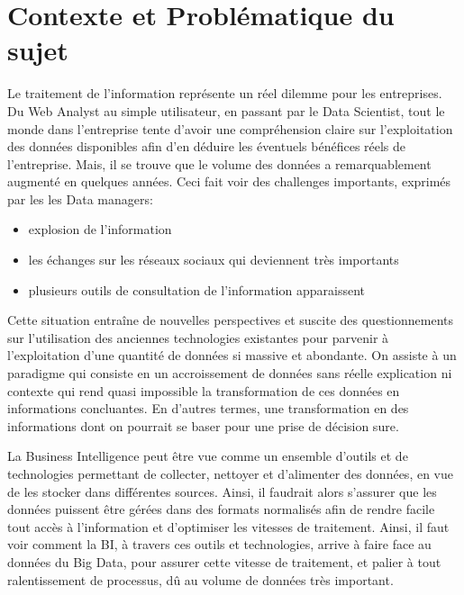 \documentclass[12pt,a4wide,twoside]{report}
\begin{document}
	\section{Contexte et Problématique du sujet}
Le traitement de l'information représente un réel dilemme pour les entreprises. Du Web Analyst au simple utilisateur, en passant par le Data Scientist, tout le monde dans l'entreprise tente d'avoir une compréhension claire sur l'exploitation des données disponibles afin d'en déduire les éventuels bénéfices réels de l'entreprise.\newline
Mais, il se trouve que le volume des données a remarquablement augmenté en quelques années. Ceci fait voir des challenges importants, exprimés par les les Data managers:
\begin{itemize}
	\item explosion de l'information
	\item les échanges sur les réseaux sociaux qui deviennent très importants
	\item plusieurs outils de consultation de l'information apparaissent 
\end{itemize}
Cette situation entraîne de nouvelles perspectives et suscite des questionnements sur l'utilisation des anciennes technologies existantes pour parvenir à l'exploitation d'une quantité de données si massive et abondante. On assiste à un paradigme qui consiste en un accroissement de données sans réelle explication ni contexte qui rend quasi impossible la transformation de ces données en informations concluantes. En d'autres termes, une transformation en des informations dont on pourrait se baser pour une prise de décision sure.


La Business Intelligence peut être vue comme un ensemble d'outils et de technologies permettant de collecter, nettoyer et d'alimenter des données, en vue de les stocker dans différentes sources. Ainsi, il faudrait alors s'assurer que les données puissent être gérées dans des formats normalisés afin de rendre facile tout accès à l'information et d'optimiser les vitesses de traitement.\newline
Ainsi, il faut voir comment la BI, à travers ces outils et technologies, arrive à faire face au données du Big Data, pour assurer cette vitesse de traitement, et palier à tout ralentissement de processus, dû au volume de données très important. 

	
\end{document}
